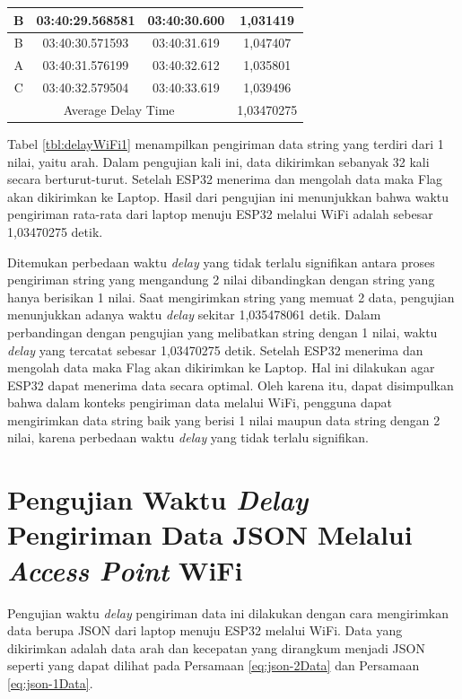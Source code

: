 \begin{longtable}{|ccc|c|}
  \multicolumn{1}{|c|}{B}    & \multicolumn{1}{c|}{03:40:29.568581} & 03:40:30.600       & 1,031419   \\ \hline
  \multicolumn{1}{|c|}{B}    & \multicolumn{1}{c|}{03:40:30.571593} & 03:40:31.619       & 1,047407   \\ \hline
  \multicolumn{1}{|c|}{A}    & \multicolumn{1}{c|}{03:40:31.576199} & 03:40:32.612       & 1,035801   \\ \hline
  \multicolumn{1}{|c|}{C}    & \multicolumn{1}{c|}{03:40:32.579504} & 03:40:33.619       & 1,039496   \\ \hline
  \multicolumn{3}{|c|}{Average Delay Time}                                               & 1,03470275 \\ \hline
  \end{longtable}

Tabel \ref{tbl:delayWiFi1} menampilkan pengiriman data string yang terdiri dari 1 nilai, yaitu arah. Dalam pengujian kali ini, data dikirimkan sebanyak 32 kali secara berturut-turut. Setelah ESP32 menerima dan mengolah data maka Flag akan dikirimkan ke Laptop. Hasil dari pengujian ini menunjukkan bahwa waktu pengiriman rata-rata dari laptop menuju ESP32 melalui WiFi adalah sebesar 1,03470275 detik.

Ditemukan perbedaan waktu \emph{delay} yang tidak terlalu signifikan antara proses pengiriman string yang mengandung 2 nilai dibandingkan dengan string yang hanya berisikan 1 nilai. Saat mengirimkan string yang memuat 2 data, pengujian menunjukkan adanya waktu \emph{delay} sekitar 1,035478061 detik. Dalam perbandingan dengan pengujian yang melibatkan string dengan 1 nilai, waktu \emph{delay} yang tercatat sebesar 1,03470275 detik. Setelah ESP32 menerima dan mengolah data maka Flag akan dikirimkan ke Laptop. Hal ini dilakukan agar ESP32 dapat menerima data secara optimal. Oleh karena itu, dapat disimpulkan bahwa dalam konteks pengiriman data melalui WiFi, pengguna dapat mengirimkan data string baik yang berisi 1 nilai maupun data string dengan 2 nilai, karena perbedaan waktu \emph{delay} yang tidak terlalu signifikan.

\section{Pengujian Waktu \emph{Delay} Pengiriman Data JSON Melalui \emph{Access Point} WiFi}
\label{sec:delayWiFiJSON}

Pengujian waktu \emph{delay} pengiriman data ini dilakukan dengan cara mengirimkan data berupa JSON dari laptop menuju ESP32 melalui WiFi. Data yang dikirimkan adalah data arah dan kecepatan yang dirangkum menjadi JSON seperti yang dapat dilihat pada Persamaan \ref{eq:json-2Data} dan Persamaan \ref{eq:json-1Data}. 



